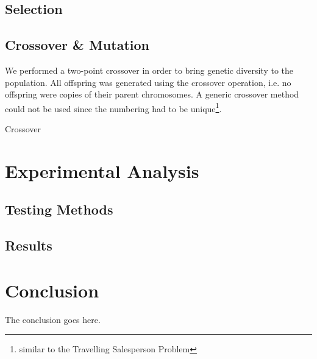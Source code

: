 \documentclass[conference,compsoc]{IEEEtran}
\begin{document}
\subsection{Selection}
\lipsum[1]
\subsection{Crossover \& Mutation}
We performed a two-point crossover in order to bring genetic diversity to the 
population. All offspring was generated using the crossover operation, i.e. no offspring 
were copies of their parent chromosomes. A generic crossover 
method could not be used since the numbering had to be unique\footnote{similar to the Travelling Salesperson Problem}.

\begin{algorithm}
\caption{Crossover}
\begin{algorithmic}
  
\end{algorithmic}
\end{algorithm}
\section{Experimental Analysis}
\subsection{Testing Methods}
\subsection{Results}
\section{Conclusion}
The conclusion goes here.











\end{document}
